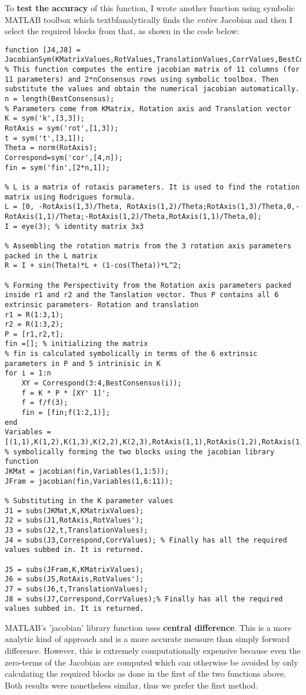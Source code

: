 \documentclass[titlepage]{article}
\begin{document}
%
 To \textbf{test the accuracy} of this function, I wrote another function using symbolic MATLAB toolbox which textbf{analytically} finds the \textit{entire} Jacobian and then I select the required blocks from that, as shown in the code below:
\begin{lstlisting}
function [J4,J8] = JacobianSym(KMatrixValues,RotValues,TranslationValues,CorrValues,BestConsensus)
% This function computes the entire jacobian matrix of 11 columns (for 11 parameters) and 2*nConsensus rows using symbolic toolbox. Then substitute the values and obtain the numerical jacobian automatically.
n = length(BestConsensus);
% Parameters come from KMatrix, Rotation axis and Translation vector
K = sym('k',[3,3]);
RotAxis = sym('rot',[1,3]);
t = sym('t',[3,1]);
Theta = norm(RotAxis);
Correspond=sym('cor',[4,n]);
fin = sym('fin',[2*n,1]);

% L is a matrix of rotaxis parameters. It is used to find the rotation matrix using Rodrigues formula.
L = [0, -RotAxis(1,3)/Theta, RotAxis(1,2)/Theta;RotAxis(1,3)/Theta,0,-RotAxis(1,1)/Theta;-RotAxis(1,2)/Theta,RotAxis(1,1)/Theta,0];
I = eye(3); % identity matrix 3x3

% Assembling the rotation matrix from the 3 rotation axis parameters packed in the L matrix
R = I + sin(Theta)*L + (1-cos(Theta))*L^2;

% Forming the Perspectivity from the Rotation axis parameters packed inside r1 and r2 and the Tanslation vector. Thus P contains all 6 extrinsic parameters- Rotation and translation
r1 = R(1:3,1);
r2 = R(1:3,2);
P = [r1,r2,t];
fin =[]; % initializing the matrix
% fin is calculated symbolically in terms of the 6 extrinsic parameters in P and 5 intrinisic in K
for i = 1:n
    XY = Correspond(3:4,BestConsensus(i));
    f = K * P * [XY' 1]';
    f = f/f(3);
    fin = [fin;f(1:2,1)];
end
Variables = [(1,1),K(1,2),K(1,3),K(2,2),K(2,3),RotAxis(1,1),RotAxis(1,2),RotAxis(1,3),t(1,1),t(2,1),t(3,1)];
% symbolically forming the two blocks using the jacobian library function
JKMat = jacobian(fin,Variables(1,1:5));
JFram = jacobian(fin,Variables(1,6:11));

% Substituting in the K parameter values
J1 = subs(JKMat,K,KMatrixValues);
J2 = subs(J1,RotAxis,RotValues');
J3 = subs(J2,t,TranslationValues);
J4 = subs(J3,Correspond,CorrValues); % Finally has all the required values subbed in. It is returned.

J5 = subs(JFram,K,KMatrixValues);
J6 = subs(J5,RotAxis,RotValues');
J7 = subs(J6,t,TranslationValues);
J8 = subs(J7,Correspond,CorrValues);% Finally has all the required values subbed in. It is returned.
\end{lstlisting}
%
MATLAB's 'jacobian' library function uses \textbf{central difference}. This is a more analytic kind of approach and is a more accurate measure than simply forward difference. However, this is extremely computationally expensive because even the zero-terms of the Jacobian are computed which can otherwise be avoided by only calculating the required blocks as done in the first of the two functions above.\\
Both results were nonetheless similar, thus we prefer the first method.
%
\end{document}
